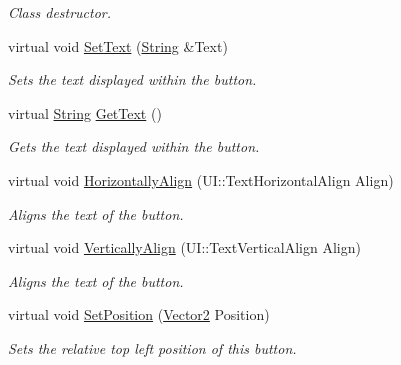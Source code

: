 \begin{DoxyCompactItemize}
\begin{DoxyCompactList}\small\item\em Class destructor. \item\end{DoxyCompactList}\item 
virtual void \hyperlink{classphys_1_1UI_1_1TextButton_ac4d77038642936e398f5a319c25ca942}{SetText} (\hyperlink{namespacephys_aa03900411993de7fbfec4789bc1d392e}{String} \&Text)
\begin{DoxyCompactList}\small\item\em Sets the text displayed within the button. \item\end{DoxyCompactList}\item 
virtual \hyperlink{namespacephys_aa03900411993de7fbfec4789bc1d392e}{String} \hyperlink{classphys_1_1UI_1_1TextButton_a8dc28f2fa610dc9bb72e5886613996bd}{GetText} ()
\begin{DoxyCompactList}\small\item\em Gets the text displayed within the button. \item\end{DoxyCompactList}\item 
virtual void \hyperlink{classphys_1_1UI_1_1TextButton_a71a64810f262725992dbeec194e8497c}{HorizontallyAlign} (UI::TextHorizontalAlign Align)
\begin{DoxyCompactList}\small\item\em Aligns the text of the button. \item\end{DoxyCompactList}\item 
virtual void \hyperlink{classphys_1_1UI_1_1TextButton_a7319f855026794c9c42f292093d1351f}{VerticallyAlign} (UI::TextVerticalAlign Align)
\begin{DoxyCompactList}\small\item\em Aligns the text of the button. \item\end{DoxyCompactList}\item 
virtual void \hyperlink{classphys_1_1UI_1_1TextButton_a57f8955e357e9e55e339237a91d8c209}{SetPosition} (\hyperlink{classphys_1_1Vector2}{Vector2} Position)
\begin{DoxyCompactList}\small\item\em Sets the relative top left position of this button. \item\end{DoxyCompactList}\item 

\end{DoxyCompactItemize}
